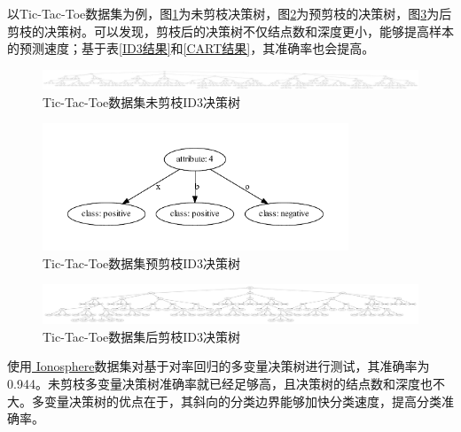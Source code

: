 \documentclass{ctexart}
\begin{document}
	以Tic-Tac-Toe数据集为例，图\ref{Tic-Tac-Toe数据集未剪枝ID3决策树}为未剪枝决策树，图\ref{Tic-Tac-Toe数据集预剪枝ID3决策树}为预剪枝的决策树，图\ref{Tic-Tac-Toe数据集后剪枝ID3决策树}为后剪枝的决策树。可以发现，剪枝后的决策树不仅结点数和深度更小，能够提高样本的预测速度；基于表\ref{ID3结果}和\ref{CART结果}，其准确率也会提高。
	
	\begin{figure}[!htb]
		\centering
		\includegraphics[scale=1,width=\textwidth]{../image/normal-Gain-tic-tac-toe.gv.pdf}
		\caption{Tic-Tac-Toe数据集未剪枝ID3决策树}
		\label{Tic-Tac-Toe数据集未剪枝ID3决策树}
	\end{figure}

	\begin{figure}[!htb]
		\centering
		\includegraphics[scale=1,height=3.8cm]{../image/pre_pruning-Gain-tic-tac-toe.gv.pdf}
		\caption{Tic-Tac-Toe数据集预剪枝ID3决策树}
		\label{Tic-Tac-Toe数据集预剪枝ID3决策树}
	\end{figure}
	
	\begin{figure}[!htb]
		\centering
		\includegraphics[scale=1,width=\textwidth]{../image/post_pruning-Gain-tic-tac-toe.gv.pdf}
		\caption{Tic-Tac-Toe数据集后剪枝ID3决策树}
		\label{Tic-Tac-Toe数据集后剪枝ID3决策树}
	\end{figure}

	使用\href{https://archive.ics.uci.edu/ml/datasets/Ionosphere}{
		Ionosphere}数据集对基于对率回归的多变量决策树进行测试，其准确率为0.944。未剪枝多变量决策树准确率就已经足够高，且决策树的结点数和深度也不大。多变量决策树的优点在于，其斜向的分类边界能够加快分类速度，提高分类准确率。
	
\end{document}
